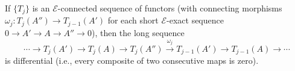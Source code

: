 If $\{T_j\}$ is an $\mathcal{E}$-connected sequence of functors (with connecting morphisms $\omega_j : T_j(A'') \to T_{j-1}(A')$ for each short $\mathcal{E}$-exact sequence $0 \to A' \to A \to A'' \to 0$), then the long sequence
\[
\cdots \to T_j(A') \to T_j(A) \to T_j(A'') \xrightarrow{\omega_j} T_{j-1}(A') \to T_{j-1}(A) \to \cdots
\]
is differential (i.e., every composite of two consecutive maps is zero).